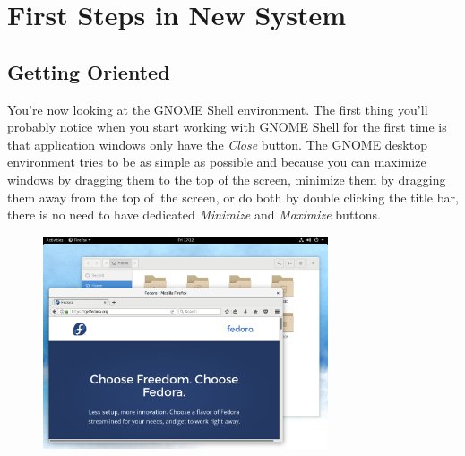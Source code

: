 \chapter*{First Steps in New System}
\section*{Getting Oriented}

You're now looking at the GNOME Shell environment. The first thing you'll probably notice when you start working with GNOME Shell for the first time is that application windows only have the \emph{Close} button. The GNOME desktop environment tries to be as simple as possible and because you can maximize windows by dragging them to the top of the screen, minimize them by dragging them away from the top of~the screen, or do both by double clicking the title bar, there is no need to have dedicated \emph{Minimize} and \emph{Maximize} buttons.

\begin{figure}[htbp]
\begin{center}
\includegraphics[width=0.75\textwidth]{img/shell-a}
 \label{fig:shell-a}
\end{center}
\end{figure}

